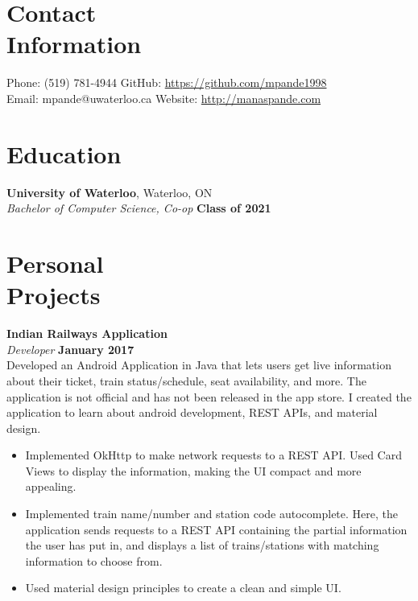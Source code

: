 \documentclass[margin,line]{resume}
\begin{document}
\begin{resume}
    \section{\mysidestyle Contact\\Information}

    Phone: (519) 781-4944       \hfill GitHub: \url{https://github.com/mpande1998} \\
    \noindent Email: mpande@uwaterloo.ca  \hfill Website: \url{http://manaspande.com} \vspace{0mm}\\\vspace{-4.5mm}

    \section{\mysidestyle Education}

    \textbf{University of Waterloo}, Waterloo, ON \vspace{2mm}\\\vspace{1mm}%
    \textsl{Bachelor of Computer Science, Co-op} \hfill \textbf{Class of 2021}

    \section{\mysidestyle Personal\\Projects}

    \textbf{Indian Railways Application} \vspace{2mm}\\\vspace{1mm}%
    \textsl{Developer} \hfill \textbf{January 2017}\\
    Developed an Android Application in Java that lets users get live information about their ticket, train status/schedule, seat availability, and more. The application is not official and has not been released in the app store. I created the application to learn about android development, REST APIs, and material design.

    \begin{itemize}
    \item Implemented OkHttp to make network requests to a REST API. Used Card Views to display the information, making the UI compact and more appealing.
    \item Implemented train name/number and station code autocomplete. Here, the application sends requests to a REST API containing the partial information the user has put in, and displays a list of trains/stations with matching information to choose from.
    \item Used material design principles to create a clean and simple UI.
    \end{itemize}


\end{resume}
\end{document}
